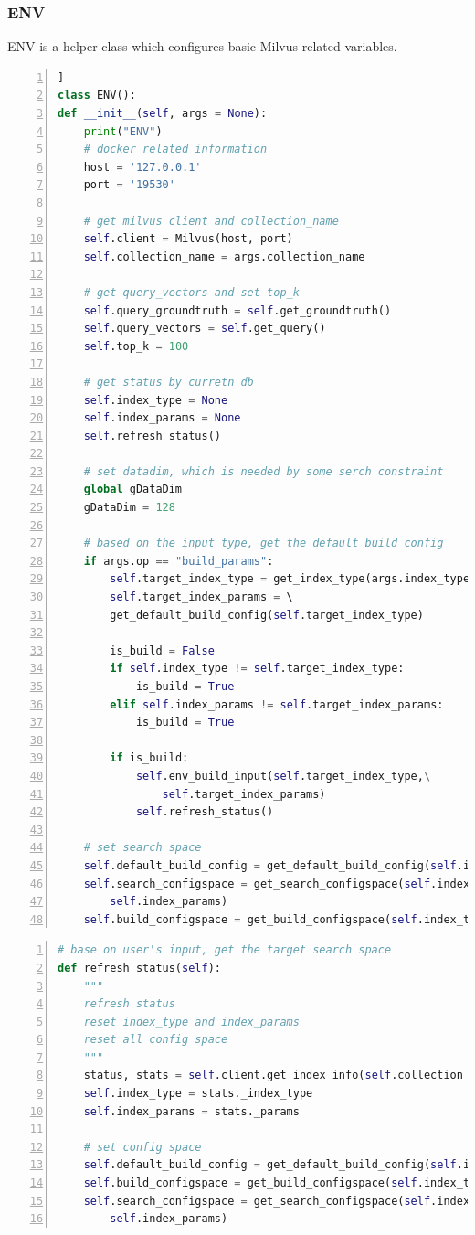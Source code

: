 \documentclass{ol-softwaremanual}
\begin{document}
\subsubsection{ENV}

ENV is a helper class which configures basic Milvus related variables. 
\begin{lstlisting}[language=python,numbers=left,basicstyle=\footnotesize, caption={ENV class config}] ]
class ENV():
def __init__(self, args = None):
    print("ENV")
    # docker related information
    host = '127.0.0.1' 
    port = '19530'

    # get milvus client and collection_name
    self.client = Milvus(host, port)
    self.collection_name = args.collection_name
    
    # get query_vectors and set top_k
    self.query_groundtruth = self.get_groundtruth()
    self.query_vectors = self.get_query()
    self.top_k = 100

    # get status by curretn db 
    self.index_type = None
    self.index_params = None
    self.refresh_status()

    # set datadim, which is needed by some serch constraint
    global gDataDim
    gDataDim = 128

    # based on the input type, get the default build config
    if args.op == "build_params":
        self.target_index_type = get_index_type(args.index_type)
        self.target_index_params = \ 
        get_default_build_config(self.target_index_type)

        is_build = False
        if self.index_type != self.target_index_type:
            is_build = True
        elif self.index_params != self.target_index_params:
            is_build = True
        
        if is_build:
            self.env_build_input(self.target_index_type,\
                self.target_index_params)
            self.refresh_status()

    # set search space
    self.default_build_config = get_default_build_config(self.index_type)
    self.search_configspace = get_search_configspace(self.index_type,\ 
        self.index_params)
    self.build_configspace = get_build_configspace(self.index_type)
\end{lstlisting}

\begin{lstlisting}[language=python,numbers=left,basicstyle=\footnotesize, caption={Refresh Status}]
# base on user's input, get the target search space
def refresh_status(self):
    """
    refresh status
    reset index_type and index_params
    reset all config space 
    """        
    status, stats = self.client.get_index_info(self.collection_name)
    self.index_type = stats._index_type
    self.index_params = stats._params

    # set config space
    self.default_build_config = get_default_build_config(self.index_type)
    self.build_configspace = get_build_configspace(self.index_type)
    self.search_configspace = get_search_configspace(self.index_type,\ 
        self.index_params)
\end{lstlisting}
\end{document}
